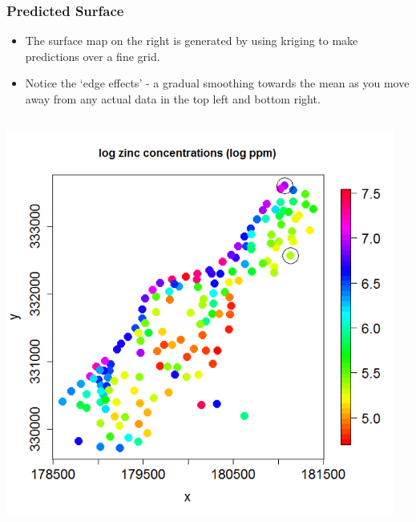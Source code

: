 \documentclass[parskip,12pt]{beamer}
\begin{document}
\begin{frame}
\frametitle{Predicted Surface}
 \begin{itemize}
 \vspace{1mm}
\item The surface map on the right is generated by using kriging to make predictions over a fine grid.
\vspace{3mm}
\item Notice the `edge effects' - a gradual smoothing towards the mean as you move away from any actual data in the top left and bottom right.
\end{itemize}
\vspace{-2mm}
\begin{columns}
\begin{column}{0.5\textwidth}
    \begin{center}
     \includegraphics[width=\textwidth]{MeusePoints}
          \end{center}
\end{column}
\begin{column}{0.5\textwidth}
    \begin{center}

\end{center}
\end{column}
\end{columns}
\end{frame}
\end{document}
